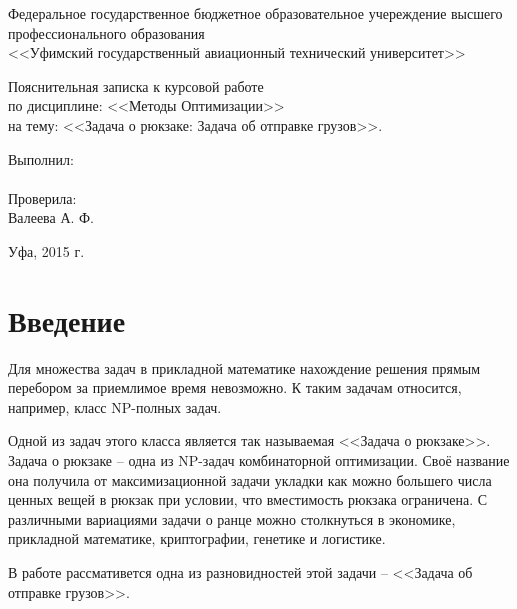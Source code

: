 \documentclass[14pt,a4paper]{extarticle}
\author{Пахтусов Н. Г., ПРО-306}
\begin{document}
\begin{center}
\thispagestyle{empty} 

Федеральное государственное бюджетное образовательное учереждение высшего \\
профессионального образования\\
<<Уфимский государственный авиационный технический университет>>
\vspace*{\fill}
\begingroup
\centering

Пояснительная записка к курсовой работе\\
по дисциплине: <<Методы Оптимизации>>\\
на тему: <<Задача о рюкзаке: Задача об отправке грузов>>.

\endgroup
\vspace*{\fill}

\end{center}

\begin{flushright}

Выполнил:\\
\@author \\
Проверила: \\
Валеева А. Ф.

\end{flushright}

\begin{center}
Уфа, 2015 г.
\end{center}

\clearpage
\tableofcontents
\clearpage
\section{Введение}

	Для множества задач в прикладной математике нахождение решения прямым перебором за приемлимое время невозможно. К таким задачам относится, например, класс NP-полных задач.
	
	Одной из задач этого класса является так называемая <<Задача о рюкзаке>>. Задача о рюкзаке -- одна из NP-задач комбинаторной оптимизации. Своё название она получила от максимизационной задачи укладки как можно большего числа ценных вещей в рюкзак при условии, что вместимость рюкзака ограничена. С различными вариациями задачи о ранце можно столкнуться в экономике, прикладной математике, криптографии, генетике и логистике.
	
	В работе рассмативется одна из разновидностей этой задачи -- <<Задача об отправке грузов>>. 
\end{document}
